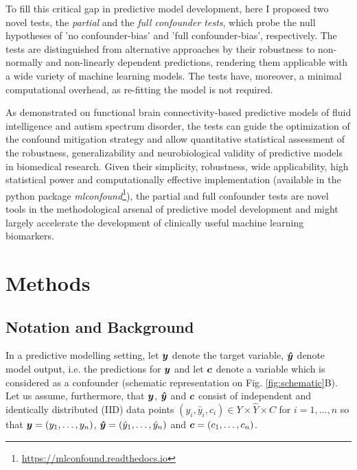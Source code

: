\documentclass{article}
\begin{document}
To fill this critical gap in predictive model development, here I proposed two novel tests, the \emph{partial} and the \emph{full confounder tests}, which probe the null hypotheses of 'no confounder-bias' and 'full confounder-bias', respectively. 
The tests are distinguished from alternative approaches by their robustness to non-normally and non-linearly dependent predictions, rendering them applicable with a wide variety of machine learning models.
The tests have, moreover, a minimal computational overhead, as re-fitting the model is not required.

As demonstrated on functional brain connectivity-based predictive models of fluid intelligence and autism spectrum disorder, the tests can guide the optimization of the confound mitigation strategy and allow quantitative statistical assessment of the robustness, generalizability and neurobiological validity of predictive models in biomedical research.
Given their simplicity, robustness, wide applicability, high statistical power and computationally effective implementation (available in the  python package \emph{mlconfound}\footnote{\href{https://mlconfound.readthedocs.io}{https://mlconfound.readthedocs.io}}), the partial and full confounder tests are novel tools in the methodological arsenal of predictive model development and might largely accelerate the development of clinically useful machine learning biomarkers.

\newpage
\section{Methods}
\label{sec:methods}

\subsection{Notation and Background}

In a predictive modelling setting, let $\boldsymbol{y}$ denote the target variable, $\boldsymbol{\hat{y}}$ denote model output, i.e. the predictions for $\boldsymbol{y}$ and let $\boldsymbol{c}$ denote a variable which is considered as a confounder (schematic representation on Fig. \ref{fig:schematic}B). Let us assume, furthermore, that $\boldsymbol{y}$, $\boldsymbol{\hat{y}}$ and $\boldsymbol{c}$ consist of independent and identically distributed (IID) data points $(y_i, \hat{y}_i, c_i) \in Y \times \hat{Y} \times C$ for $i=1, \dots , n$ so that $\boldsymbol{y}=(y_1, \dots ,y_n)$, $\boldsymbol{\hat{y}}=(\hat{y}_1, \dots, \hat{y}_n)$ and $\boldsymbol{c}=(c_1, \dots, c_n)$. 
\end{document}

